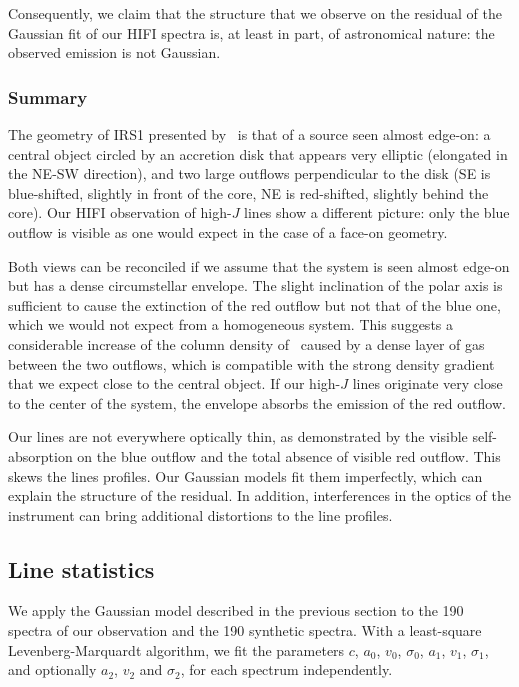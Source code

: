 Consequently, we claim that the structure that we observe on the residual of the Gaussian fit of our HIFI spectra is, at least in part, of astronomical nature: the observed emission is not Gaussian.




\subsubsection{Summary}
The geometry of IRS1 presented by~\textcite{maud2013s140} is that of a source seen almost edge-on: a central object circled by an accretion disk that appears very elliptic (elongated in the NE-SW direction), and two large  outflows perpendicular to the disk (SE is blue-shifted, slightly in front of the core, NE is red-shifted, slightly behind the core).
Our HIFI observation of high-$J$  lines show a different picture: only the blue outflow is visible as one would expect in the case of a face-on geometry.

Both views can be reconciled if we assume that the system is seen almost edge-on but has a dense circumstellar envelope.
The slight inclination of the polar axis is sufficient to cause the extinction of the red outflow but not that of the blue one, which we would not expect from a homogeneous system.
This suggests a considerable increase of the column density of~ caused by a dense layer of gas between the two outflows, which is compatible with the strong density gradient that we expect close to the central object.
If our high-$J$  lines originate very close to the center of the system,
the envelope absorbs the emission of the red outflow.

Our lines are not everywhere optically thin, as demonstrated by the visible self-absorption on the blue outflow and the total absence of visible red outflow.
This skews the lines profiles.
Our Gaussian models fit them imperfectly, which can explain the structure of the residual.
In addition, interferences in the optics of the instrument can bring additional distortions to the line profiles.


\FloatBarrier
\subsection{Line statistics}
We apply the Gaussian model described in the previous section to the 190 spectra of our observation and the 190 synthetic spectra.
With a least-square Levenberg-Marquardt algorithm, we fit the parameters
$c$,
$a_0$, $v_0$, $\sigma_0$,
$a_1$, $v_1$, $\sigma_1$, and optionally
$a_2$, $v_2$ and $\sigma_2$, for each spectrum independently.

